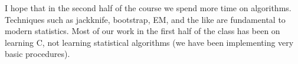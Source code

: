 \documentclass{report}
\begin{document}
I hope that in the second half of the course we spend more time on algorithms.
Techniques such as jackknife, bootstrap, EM, and the like are fundamental to
modern statistics. Most of our work in the first half of the class has been on
learning C, not learning statistical algorithms (we have been implementing very
basic procedures). 
\end{document}
